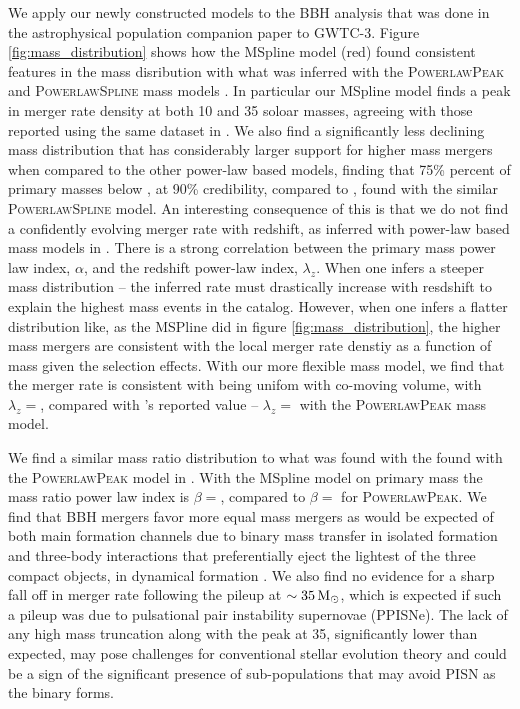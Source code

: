 We apply our newly constructed models to the BBH analysis that was done in the astrophysical population companion paper to GWTC-3. 
Figure \ref{fig:mass_distribution} shows how the MSpline model (red) found consistent features in the mass disribution with 
what was inferred with the \textsc{PowerlawPeak} and \textsc{PowerlawSpline} mass models \cite{Talbot_2018,o3a_pop,Edelman_2022ApJ,o3b_astro_dist}. 
In particular our MSpline model finds a peak in merger rate density at both 10 and 35 soloar masses, agreeing with those reported using the same dataset in \citet{o3b_astro_dist}. 
We also find a significantly less declining mass distribution that has considerably larger support for higher mass mergers when 
compared to the other power-law based models, finding that 75\% percent of primary masses below \result{$\CIPlusMinus{\macros[MassDistribution][MSpline][m_75percentile]}$}, 
at 90\% credibility, compared to \result{$\CIPlusMinus{\macros[MassDistribution][PLSpline][m_75percentile]}$}, found with the similar \textsc{PowerlawSpline} model. 
An interesting consequence of this is that we do not find a confidently evolving merger rate with redshift, as inferred with power-law based mass models in \citet{o3b_astro_dist}. 
There is a strong correlation between the primary mass power law index, $\alpha$, and the redshift power-law index, $\lambda_z$. When one infers a steeper mass distribution -- 
the inferred rate must drastically increase with resdshift to explain the highest mass events in the catalog. However, when one infers a 
flatter distribution like, as the MSPline did in figure \ref{fig:mass_distribution}, the higher mass mergers are consistent with 
the local merger rate denstiy as a function of mass given the selection effects. With our more flexible mass model, we find that the merger rate 
is consistent with being unifom with co-moving volume, with $\lambda_z = $\result{$\CIPlusMinus{\macros[MSplineIIDCompSpins][lamb]}$}, compared with 
\citet{o3b_astro_dist}'s reported value -- $\lambda_z = $\result{$\CIPlusMinus{\macros[PLPeak][lamb]}$} with the \textsc{PowerlawPeak} mass model.

We find a similar mass ratio distribution to what was found with the found with the \textsc{PowerlawPeak} model in \citet{o3b_astro_dist}. 
With the MSpline model on primary mass the mass ratio power law index is $\beta = $\result{$\CIPlusMinus{\macros[MSplineIIDCompSpins][beta]}$}, 
compared to $\beta = $\result{$\CIPlusMinus{\macros[PLPeak][beta]}$} for \textsc{PowerlawPeak}. We find that BBH mergers favor more equal mass mergers
as would be expected of both main formation channels due to binary mass transfer in isolated formation and three-body interactions that preferentially eject
the lightest of the three compact objects, in dynamical formation . We also find no evidence for a sharp fall off in merger rate following 
the pileup at $\sim35\,{\rm M}_\odot$, which is expected if such a pileup was due to pulsational pair instability supernovae (PPISNe). The lack of any high mass truncation 
along with the peak at 35\msun, significantly lower than expected, may pose challenges for conventional stellar evolution theory and could be a sign of 
the significant presence of sub-populations that may avoid PISN as the binary forms. 

